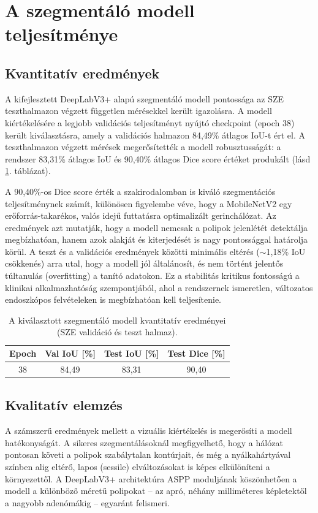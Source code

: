 \documentclass[12pt, a4paper]{report}
\begin{document}
\section{A szegmentáló modell teljesítménye}

\subsection{Kvantitatív eredmények}
A kifejlesztett DeepLabV3+ alapú szegmentáló modell pontossága az SZE teszthalmazon végzett független mérésekkel került igazolásra. A modell kiértékelésére a legjobb validációs teljesítményt nyújtó checkpoint (epoch 38) került kiválasztásra, amely a validációs halmazon 84,49\% átlagos IoU-t ért el. A teszthalmazon végzett mérések megerősítették a modell robusztusságát: a rendszer 83,31\% átlagos IoU és 90,40\% átlagos Dice score értéket produkált (lásd \ref{tab:kvant_eredmenyek_epoch38}. táblázat).

A 90,40\%-os Dice score érték a szakirodalomban is kiváló szegmentációs teljesítménynek számít, különösen figyelembe véve, hogy a MobileNetV2 egy erőforrás-takarékos, valós idejű futtatásra optimalizált gerinchálózat. Az eredmények azt mutatják, hogy a modell nemcsak a polipok jelenlétét detektálja megbízhatóan, hanem azok alakját és kiterjedését is nagy pontossággal határolja körül. A teszt és a validációs eredmények közötti minimális eltérés ($\sim$1,18\% IoU csökkenés) arra utal, hogy a modell jól általánosít, és nem történt jelentős túltanulás (overfitting) a tanító adatokon. Ez a stabilitás kritikus fontosságú a klinikai alkalmazhatóság szempontjából, ahol a rendszernek ismeretlen, változatos endoszkópos felvételeken is megbízhatóan kell teljesítenie.

\begin{table}[h]
    \centering
    \caption{A kiválasztott szegmentáló modell kvantitatív eredményei (SZE validáció és teszt halmaz).}
    \label{tab:kvant_eredmenyek_epoch38}
    \begin{tabular}{c c c c}
        \hline
        Epoch & Val IoU [\%] & Test IoU [\%] & Test Dice [\%] \\
        \hline
        38 & 84,49 & 83,31 & 90,40 \\
        \hline
    \end{tabular}
\end{table}

\subsection{Kvalitatív elemzés}
A számszerű eredmények mellett a vizuális kiértékelés is megerősíti a modell hatékonyságát. A sikeres szegmentálásoknál megfigyelhető, hogy a hálózat pontosan követi a polipok szabálytalan kontúrjait, és még a nyálkahártyával színben alig eltérő, lapos (sessile) elváltozásokat is képes elkülöníteni a környezettől. A DeepLabV3+ architektúra ASPP moduljának köszönhetően a modell a különböző méretű polipokat -- az apró, néhány milliméteres képletektől a nagyobb adenómákig -- egyaránt felismeri.
\end{document}
